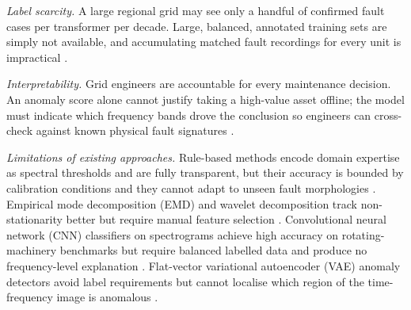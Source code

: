\documentclass[preprint,12pt,3p]{elsarticle}
\let\cite\citep   %
\begin{document}
\textit{Label scarcity.}
A large regional grid may see only a handful of confirmed fault cases
per transformer per decade.
Large, balanced, annotated training sets are simply not available, and
accumulating matched fault recordings for every unit is impractical
\cite{zhao2020shrinkage}.

\textit{Interpretability.}
Grid engineers are accountable for every maintenance decision.
An anomaly score alone cannot justify taking a high-value asset offline;
the model must indicate which frequency bands drove the conclusion so
engineers can cross-check against known physical fault signatures
\cite{rudin2019stop}.

\textit{Limitations of existing approaches.}
Rule-based methods encode domain expertise as spectral thresholds and
are fully transparent, but their accuracy is bounded by calibration
conditions and they cannot adapt to unseen fault morphologies
\cite{ieee2019c57}.
Empirical mode decomposition (EMD) and wavelet decomposition track
non-stationarity better but require manual feature selection \cite{peng2004wavelet}.
Convolutional neural network (CNN) classifiers on spectrograms achieve
high accuracy on rotating-machinery benchmarks but require balanced
labelled data and produce no frequency-level explanation
\cite{guo2019transfer,wen2018cnn}.
Flat-vector variational autoencoder (VAE) anomaly detectors avoid label
requirements but cannot
localise which region of the time-frequency image is anomalous
\cite{kingma2013auto,an2015variational}.
\end{document}
